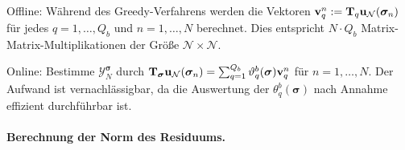 \documentclass[../main.tex]{subfiles}
\begin{document}
\begin{onoffdescription}
    \item[Offline:]
    Während des Greedy-Verfahrens werden die Vektoren $\mathbf{v}_{q}^{n} := \mathbf{T}_{q} \mathbf{u}_{\mathcal N}(\bm \sigma_{n})$ für jedes $q = 1, \dots, Q_{b}$ und $n = 1, \dots, N$ berechnet.
    Dies entspricht $N \cdot Q_b$ Matrix-Matrix-Multiplikationen der Größe $\mathcal N \times \mathcal N$.

    \item[Online:]
    Bestimme $\mathcal Y_{N}^{\bm \sigma}$ durch $\mathbf{T}_{\bm \sigma} \mathbf{u}_{\mathcal N}(\bm \sigma_{n}) = \sum_{q = 1}^{Q_b} \vartheta_{q}^{b}(\bm \sigma) \mathbf{v}_{q}^{n}$ für $n = 1, \dots, N$.
    Der Aufwand ist vernachlässigbar, da die Auswertung der $\theta_{q}^{b}(\bm \sigma)$ nach Annahme effizient durchführbar ist.
\end{onoffdescription}


\paragraph{Berechnung der Norm des Residuums.} %
\label{par:berechnung_der_norm_des_residuum}
\end{document}
